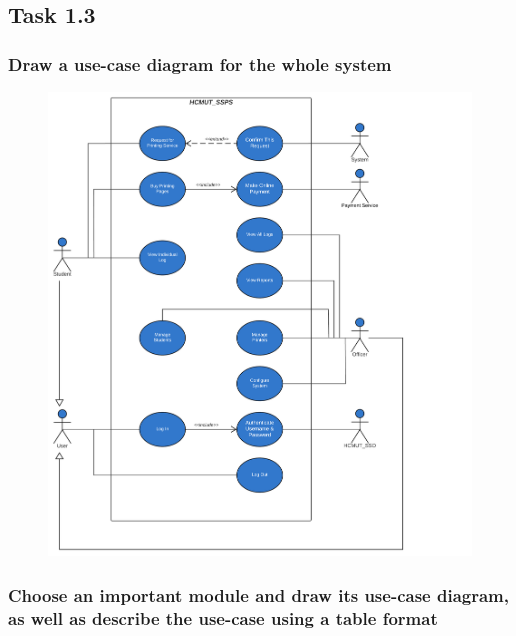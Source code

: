 \newpage
    \subsection{Task 1.3}
    \subsubsection{Draw a use-case diagram for the whole system}
    \begin{center}
    \begin{figure}[htp]
    \begin{center}
     \includegraphics[scale=.62]{images/Task1/wholeSystem.png}
    \end{center}
    \label{refhinh1}
    \end{figure}
    \end{center}

    \newpage
    \subsubsection{Choose an important module and draw its use-case diagram, as well as describe the use-case using a table format}

